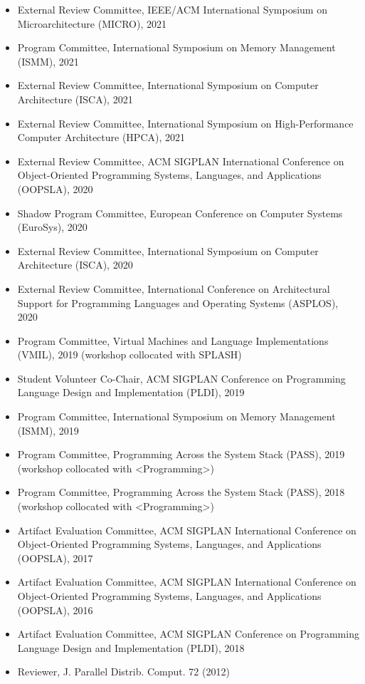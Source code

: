 \documentclass[singlecolumn,singlespace,11pt]{article}
\begin{document}
\begin{itemize}
\item External Review Committee, IEEE/ACM International Symposium on Microarchitecture (MICRO), 2021
\item Program Committee, International Symposium on Memory Management (ISMM), 2021
\item External Review Committee, International Symposium on Computer Architecture (ISCA), 2021
\item External Review Committee, International Symposium on High-Performance Computer Architecture (HPCA), 2021
\item External Review Committee, ACM SIGPLAN International Conference on Object-Oriented Programming Systems, Languages, and Applications (OOPSLA), 2020
\item Shadow Program Committee, European Conference on Computer Systems (EuroSys), 2020
\item External Review Committee, International Symposium on Computer Architecture (ISCA), 2020
\item External Review Committee, International Conference on Architectural Support for Programming Languages and Operating Systems (ASPLOS), 2020
\item Program Committee, Virtual Machines and Language Implementations (VMIL), 2019 (workshop collocated with SPLASH)
\item Student Volunteer Co-Chair, ACM SIGPLAN Conference on Programming Language Design and Implementation (PLDI), 2019
\item Program Committee, International Symposium on Memory Management (ISMM), 2019
\item Program Committee, Programming Across the System Stack (PASS), 2019 (workshop collocated with <Programming>) 
\item Program Committee, Programming Across the System Stack (PASS), 2018 (workshop collocated with  <Programming>) 
\item Artifact Evaluation Committee, ACM SIGPLAN International Conference on Object-Oriented Programming Systems, Languages, and Applications (OOPSLA), 2017  
\item Artifact Evaluation Committee, ACM SIGPLAN International Conference on Object-Oriented Programming Systems, Languages, and Applications (OOPSLA), 2016  
\item Artifact Evaluation Committee, ACM SIGPLAN Conference on Programming Language Design and Implementation (PLDI), 2018
\item Reviewer, J. Parallel Distrib. Comput. 72 (2012) 
\end{itemize}
\end{document}
